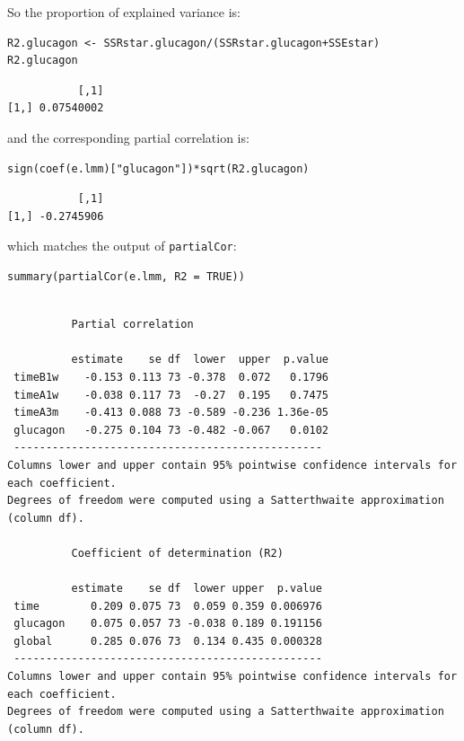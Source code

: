 \documentclass[12pt]{article}
\begin{document}
So the proportion of explained variance is:
\lstset{language=r,label= ,caption= ,captionpos=b,numbers=none}
\begin{lstlisting}
R2.glucagon <- SSRstar.glucagon/(SSRstar.glucagon+SSEstar)
R2.glucagon
\end{lstlisting}

\begin{verbatim}
           [,1]
[1,] 0.07540002
\end{verbatim}


and the corresponding partial correlation is:
\lstset{language=r,label= ,caption= ,captionpos=b,numbers=none}
\begin{lstlisting}
sign(coef(e.lmm)["glucagon"])*sqrt(R2.glucagon)
\end{lstlisting}

\begin{verbatim}
           [,1]
[1,] -0.2745906
\end{verbatim}


which matches the output of \texttt{partialCor}:
\lstset{language=r,label= ,caption= ,captionpos=b,numbers=none}
\begin{lstlisting}
summary(partialCor(e.lmm, R2 = TRUE))
\end{lstlisting}

\begin{verbatim}

	      Partial correlation 

          estimate    se df  lower  upper  p.value
 timeB1w    -0.153 0.113 73 -0.378  0.072   0.1796
 timeA1w    -0.038 0.117 73  -0.27  0.195   0.7475
 timeA3m    -0.413 0.088 73 -0.589 -0.236 1.36e-05
 glucagon   -0.275 0.104 73 -0.482 -0.067   0.0102
 ------------------------------------------------ 
Columns lower and upper contain 95% pointwise confidence intervals for each coefficient.
Degrees of freedom were computed using a Satterthwaite approximation (column df). 

	      Coefficient of determination (R2)

          estimate    se df  lower upper  p.value
 time        0.209 0.075 73  0.059 0.359 0.006976
 glucagon    0.075 0.057 73 -0.038 0.189 0.191156
 global      0.285 0.076 73  0.134 0.435 0.000328
 ------------------------------------------------ 
Columns lower and upper contain 95% pointwise confidence intervals for each coefficient.
Degrees of freedom were computed using a Satterthwaite approximation (column df).
\end{verbatim}
\end{document}
